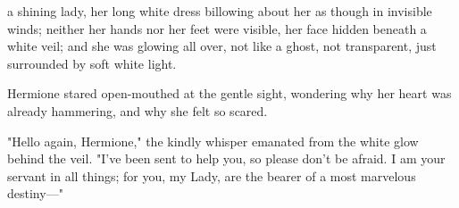 {\el} a shining lady, her long white dress billowing about her as though in
invisible winds; neither her hands nor her feet were visible, her face hidden
beneath a white veil; and she was glowing all over, not like a ghost, not
transparent, just surrounded by soft white light.

Hermione stared open-mouthed at the gentle sight, wondering why her heart was
already hammering, and why she felt so scared.

"Hello again, Hermione," the kindly whisper emanated from the white glow behind
the veil. "I've been sent to help you, so please don't be afraid. I am your
servant in all things; for you, my Lady, are the bearer of a most marvelous
destiny---"

\begin{center}
{\el}

{\el}

{\el}
\end{center}
